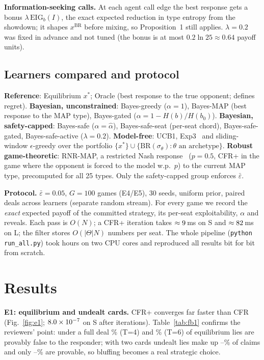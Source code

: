 \documentclass[11pt]{article}
\newcommand{\eps}{\varepsilon}
\newcommand{\epsbar}{\bar{\eps}}
\newcommand{\BR}{\mathrm{BR}}
\begin{document}
\textbf{Information-seeking calls.} At each agent call edge the best response gets a bonus $\lambda\,\mathrm{EIG}_b(I)$, the exact expected reduction in type entropy from the showdown; it shapes $x^{\BR}$ before mixing, so Proposition~1 still applies. $\lambda=0.2$ was fixed in advance and not tuned (the bonus is at most $0.2\ln25\approx0.64$ payoff units).

\subsection{Learners compared and protocol}
\textbf{Reference}: Equilibrium $x^*$; Oracle (best response to the true opponent; defines regret). \textbf{Bayesian, unconstrained}: Bayes-greedy ($\alpha=1$), Bayes-MAP (best response to the MAP type), Bayes-gated ($\alpha=1-H(b)/H(b_0)$). \textbf{Bayesian, safety-capped}: Bayes-safe ($\alpha=\hat\alpha$), Bayes-safe-seat (per-seat chord), Bayes-safe-gated, Bayes-safe-active ($\lambda=0.2$). \textbf{Model-free}: UCB1, Exp3~\cite{auer2002ucb,auer2002exp3} and sliding-window $\epsilon$-greedy over the portfolio $\{x^*\}\cup\{\BR(\sigma_\theta):\theta\text{ an archetype}\}$. \textbf{Robust game-theoretic}: RNR-MAP, a restricted Nash response~\cite{johanson2007} ($p=0.5$, CFR+ in the game where the opponent is forced to the model w.p.\ $p$) to the current MAP type, precomputed for all 25 types. Only the safety-capped group enforces $\epsbar$.

\textbf{Protocol.} $\epsbar=0.05$, $G=100$ games (E4/E5), 30 seeds, uniform prior, paired deals across learners (separate random stream). For every game we record the \emph{exact} expected payoff of the committed strategy, its per-seat exploitability, $\alpha$ and reveals. Each pass is $O(N)$; a CFR+ iteration takes $\approx9$\,ms on S and $\approx82$\,ms on L; the filter stores $O(|\Theta|N)$ numbers per seat. The whole pipeline (\texttt{python run\_all.py}) took \RpipelineHours{} hours on two CPU cores and reproduced all results bit for bit from scratch.

\section{Results}
\textbf{E1: equilibrium and undealt cards.} CFR+ converges far faster than CFR (Fig.~\ref{fig:e1}; $8.0\times10^{-7}$ on S after \RitersS{} iterations). Table~\ref{tab:fb1} confirms the reviewers' point: under a full deal \RfullProvT\% (T=4) and \RfullProvSix\% (T=6) of equilibrium lies are provably false to the responder; with two cards undealt lies make up \RpartLieLo--\RpartLieHi\% of claims and only \RpartProvLo--\RpartProvHi\% are provable, so bluffing becomes a real strategic choice.
\end{document}
